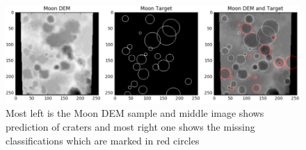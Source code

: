 \documentclass[11pt]{article}
\begin{document}
\begin{figure}[H]
	\includegraphics[width=\linewidth]{files/unet/dem.png}
	\caption{Most left is the Moon DEM sample and middle image shows prediction of craters and most right one shows the missing classifications which are marked in red circles}
	\label{dem}
\end{figure}







\end{document}
